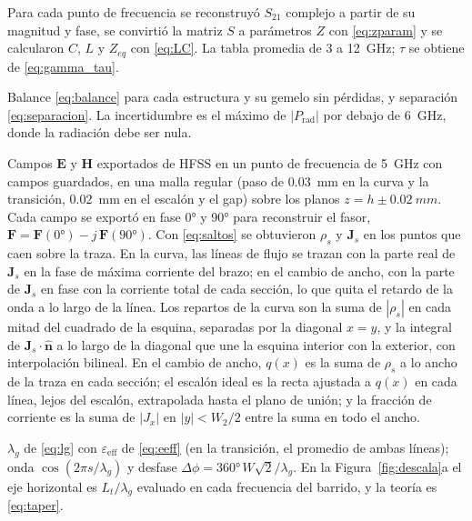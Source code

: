 \documentclass[11pt,letterpaper]{article}
\begin{document}
\begin{description}[style=nextline,leftmargin=0pt,itemsep=4pt,font=\normalfont\bfseries]
\item[Figura~\ref{fig:lc} y Tabla~\ref{tab:lc} (circuito de la curva)] Para cada punto de frecuencia se reconstruyó $S_{21}$ complejo a partir de su magnitud y fase, se convirtió la matriz $S$ a parámetros $Z$ con \eqref{eq:zparam} y se calcularon $C$, $L$ y $Z_{eq}$ con \eqref{eq:LC}. La tabla promedia de 3 a \SI{12}{GHz}; $\tau$ se obtiene de \eqref{eq:gamma_tau}.

\item[Figura~\ref{fig:rad} y Tabla~\ref{tab:potencia} (potencia en la curva)] Balance \eqref{eq:balance} para cada estructura y su gemelo sin pérdidas, y separación \eqref{eq:separacion}. La incertidumbre es el máximo de $|P_{\mathrm{rad}}|$ por debajo de \SI{6}{GHz}, donde la radiación debe ser nula.

\item[Figura~\ref{fig:carga} (carga y corriente)] Campos $\mathbf{E}$ y $\mathbf{H}$ exportados de HFSS en un punto de frecuencia de \SI{5}{GHz} con campos guardados, en una malla regular (paso de \SI{0.03}{mm} en la curva y la transición, \SI{0.02}{mm} en el escalón y el gap) sobre los planos $z=h\pm\SI{0.02}{mm}$. Cada campo se exportó en fase \ang{0} y \ang{90} para reconstruir el fasor, $\mathbf{F}=\mathbf{F}(\ang{0})-j\,\mathbf{F}(\ang{90})$. Con \eqref{eq:saltos} se obtuvieron $\rho_s$ y $\mathbf{J}_s$ en los puntos que caen sobre la traza. En la curva, las líneas de flujo se trazan con la parte real de $\mathbf{J}_s$ en la fase de máxima corriente del brazo; en el cambio de ancho, con la parte de $\mathbf{J}_s$ en fase con la corriente total de cada sección, lo que quita el retardo de la onda a lo largo de la línea. Los repartos de la curva son la suma de $|\rho_s|$ en cada mitad del cuadrado de la esquina, separadas por la diagonal $x=y$, y la integral de $\mathbf{J}_s\cdot\hat{\mathbf{n}}$ a lo largo de la diagonal que une la esquina interior con la exterior, con interpolación bilineal. En el cambio de ancho, $q(x)$ es la suma de $\rho_s$ a lo ancho de la traza en cada sección; el escalón ideal es la recta ajustada a $q(x)$ en cada línea, lejos del escalón, extrapolada hasta el plano de unión; y la fracción de corriente es la suma de $|J_x|$ en $|y|<W_2/2$ entre la suma en todo el ancho.

\item[Figura~\ref{fig:escala} (escala de la onda)] $\lambda_g$ de \eqref{eq:lg} con $\varepsilon_{\mathrm{eff}}$ de \eqref{eq:eeff} (en la transición, el promedio de ambas líneas); onda $\cos(2\pi s/\lambda_g)$ y desfase $\Delta\phi=\ang{360}\,W\sqrt{2}/\lambda_g$. En la Figura~\ref{fig:descala}a el eje horizontal es $L_t/\lambda_g$ evaluado en cada frecuencia del barrido, y la teoría es \eqref{eq:taper}.


\end{description}
\end{document}
